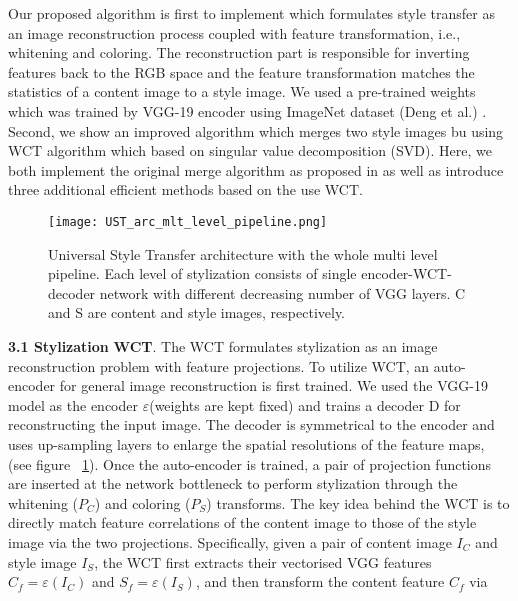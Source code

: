 \hspace{0.5cm} Our proposed algorithm is first to implement \cite{bib11} which formulates style transfer as an image reconstruction process coupled with feature transformation,
i.e., whitening and coloring. The reconstruction part is responsible for inverting features back to the
RGB space and the feature transformation matches the statistics of a content image to a style image.
We used a pre-trained weights which was trained by VGG-19 \cite{bib20} encoder using ImageNet dataset (Deng et al.) \cite{bib21}.
Second, we show an improved algorithm which merges two style images bu using WCT algorithm which based on singular value decomposition (SVD). Here, we both implement the original merge algorithm as proposed in \cite{bib11} as well as introduce three additional efficient methods based on the use WCT.
\begin{figure}[h!]
	\centering
		\texttt{[image: UST\_arc\_mlt\_level\_pipeline.png]}
	\caption{Universal Style Transfer architecture with the whole multi level pipeline. Each level of stylization consists of single encoder-WCT-decoder network with different decreasing number of VGG layers. C and S are content and style images, respectively.
	}
	\label{fig:full-pipeline}
\end{figure}
\newline
\newline\textbf{3.1  Stylization}\newline
\newline \textbf{WCT}. The WCT \cite{bib11} formulates stylization as an image reconstruction problem with feature projections. To utilize WCT, an auto-encoder for general image reconstruction is first trained. We used the VGG-19 model \cite{bib20} as the encoder $\varepsilon$(weights are kept fixed) and trains a decoder D for reconstructing the input image. The decoder is symmetrical to the encoder and uses up-sampling layers to enlarge the spatial resolutions of the feature maps, (see figure ~\ref{fig:full-pipeline}). Once the auto-encoder is trained, a pair of projection functions are inserted at the network bottleneck to perform stylization through the whitening ($P_C$) and coloring ($P_S$) transforms. The key idea behind the WCT is to directly match feature correlations of the content image to those of the style image via the two projections. Specifically, given a pair of content image $I_C$ and style image $I_S$, the WCT first extracts their vectorised VGG features $C_f=\varepsilon(I_C)$ and $S_f=\varepsilon(I_S)$, and then transform the content feature $C_f$ via
